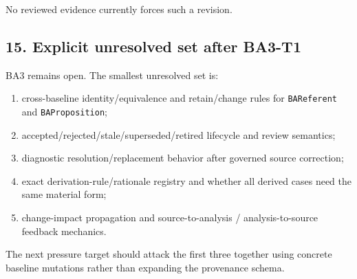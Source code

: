\documentclass[11pt,a4paper]{article}
\providecommand{\tightlist}{\setlength{\itemsep}{0pt}\setlength{\parskip}{0pt}}
\begin{document}
No reviewed evidence currently forces such a revision.

\subsection{15. Explicit unresolved set after BA3-T1}\label{15-explicit-unresolved-set-after-ba3-t1}

BA3 remains open. The smallest unresolved set is:

\begin{enumerate}
\def\labelenumi{\arabic{enumi}.}
\tightlist
\item
  cross-baseline identity/equivalence and retain/change rules for \texttt{BAReferent} and \texttt{BAProposition};
\item
  accepted/rejected/stale/superseded/retired lifecycle and review semantics;
\item
  diagnostic resolution/replacement behavior after governed source correction;
\item
  exact derivation-rule/rationale registry and whether all derived cases need the same material form;
\item
  change-impact propagation and source-to-analysis / analysis-to-source feedback mechanics.
\end{enumerate}

The next pressure target should attack the first three together using concrete baseline mutations rather than expanding the provenance schema.
\end{document}
